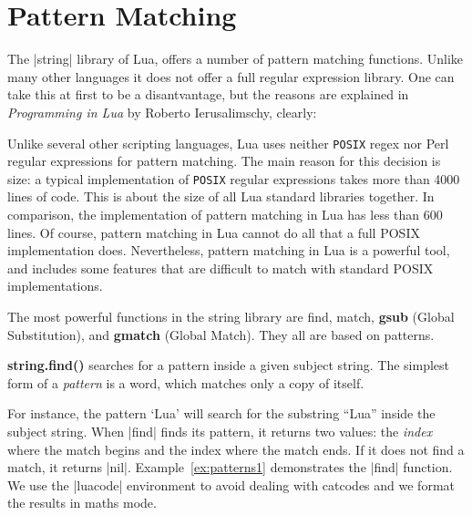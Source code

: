 \def\luacmd#1{\textbf{#1}}

\chapter{Pattern Matching}

The |string| library of Lua, offers a number of pattern matching functions. Unlike many other languages it does not offer a full regular expression library. One can take this at first to be a disantvantage, but the reasons are explained in \textit{Programming in Lua} by Roberto Ierusalimschy, clearly:

\begin{latexquotation}
Unlike several other scripting languages, Lua uses neither \texttt{POSIX} regex nor
Perl regular expressions for pattern matching. The main reason for this decision
is size: a typical implementation of \texttt{POSIX} regular expressions takes more than
4000 lines of code. This is about the size of all Lua standard libraries together.
In comparison, the implementation of pattern matching in Lua has less than
600 lines. Of course, pattern matching in Lua cannot do all that a full POSIX
implementation does. Nevertheless, pattern matching in Lua is a powerful tool,
and includes some features that are difficult to match with standard POSIX
implementations.
\end{latexquotation}

The most powerful functions in the string library are find, match, \luacmd{gsub} (Global
Substitution), and \luacmd{gmatch} (Global Match). They all are based on patterns.


\luacmd{string.find()}
searches for a pattern inside a given subject string. The simplest form of a \textit{pattern} is a word, which matches only a copy of itself.

For instance, the pattern ‘Lua’ will search for the substring “Lua” inside the
subject string. When |find| finds its pattern, it returns two values: the \textit{index} where the match begins and the index where the match ends. If it does not find a match, it returns |nil|. Example~\ref{ex:patterns1} demonstrates the |find| function. We use the |luacode| environment to avoid dealing with catcodes and we format the results in maths mode.

